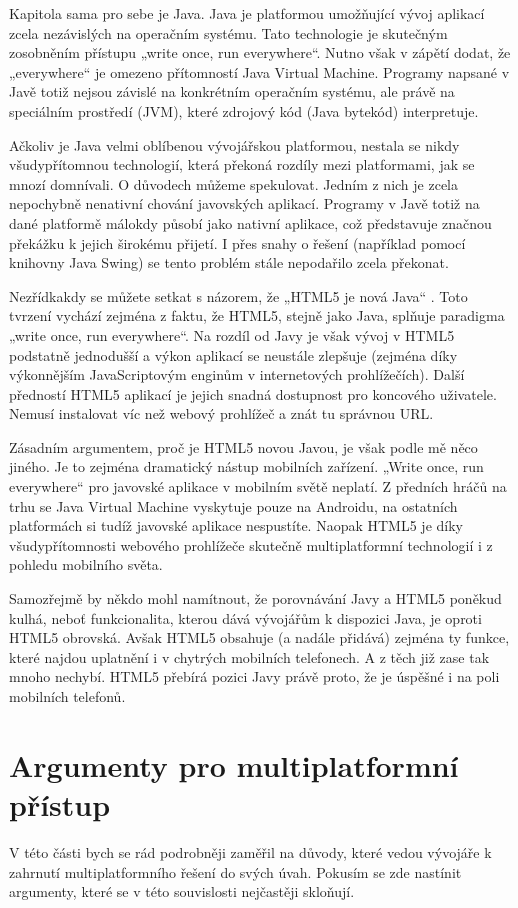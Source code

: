 Kapitola sama pro sebe je Java. Java je platformou umožňující vývoj aplikací zcela nezávislých na operačním systému. Tato technologie je skutečným zosobněním přístupu „write once, run everywhere“. Nutno však v zápětí dodat, že „everywhere“ je omezeno přítomností Java Virtual Machine. Programy napsané v Javě totiž nejsou závislé na konkrétním operačním systému, ale právě na speciálním prostředí (JVM), které zdrojový kód (Java bytekód) interpretuje.

Ačkoliv je Java velmi oblíbenou vývojářskou platformou, nestala se nikdy všudypřítomnou technologií, která překoná rozdíly mezi platformami, jak se mnozí domnívali. O důvodech můžeme spekulovat. Jedním z nich je zcela nepochybně nenativní chování javovských aplikací. Programy v Javě totiž na dané platformě málokdy působí jako nativní aplikace, což představuje značnou překážku k jejich širokému přijetí. I přes snahy o řešení (například pomocí knihovny Java Swing) se tento problém stále nepodařilo zcela překonat.

Nezřídkakdy se můžete setkat s názorem, že „HTML5 je nová Java“ \cite{why_html5_java}. Toto tvrzení vychází zejména z faktu, že HTML5, stejně jako Java, splňuje paradigma „write once, run everywhere“. Na rozdíl od Javy je však vývoj v HTML5 podstatně jednodušší a výkon aplikací se neustále zlepšuje (zejména díky výkonnějším JavaScriptovým enginům v internetových prohlížečích). Další předností HTML5 aplikací je jejich snadná dostupnost pro koncového uživatele. Nemusí instalovat víc než webový prohlížeč a znát tu správnou URL. 

Zásadním argumentem, proč je HTML5 novou Javou, je však podle mě něco jiného. Je to zejména dramatický nástup mobilních zařízení. „Write once, run everywhere“ pro javovské aplikace v mobilním světě neplatí. Z předních hráčů na trhu se Java Virtual Machine vyskytuje pouze na Androidu, na ostatních platformách si tudíž javovské aplikace nespustíte. Naopak HTML5 je díky všudypřítomnosti webového prohlížeče skutečně multiplatformní technologií i z pohledu mobilního světa. 

Samozřejmě by někdo mohl namítnout, že porovnávání Javy a HTML5 poněkud kulhá, neboť funkcionalita, kterou dává vývojářům k dispozici Java, je oproti HTML5 obrovská. Avšak HTML5 obsahuje (a nadále přidává) zejména ty funkce, které najdou uplatnění i v chytrých mobilních telefonech. A z těch již zase tak mnoho nechybí. HTML5 přebírá pozici Javy právě proto, že je úspěšné i na poli mobilních telefonů.

\section{Argumenty pro multiplatformní přístup}
V této části bych se rád podrobněji zaměřil na důvody, které vedou vývojáře k zahrnutí multiplatformního řešení do svých úvah. Pokusím se zde nastínit argumenty, které se v této souvislosti nejčastěji skloňují.

